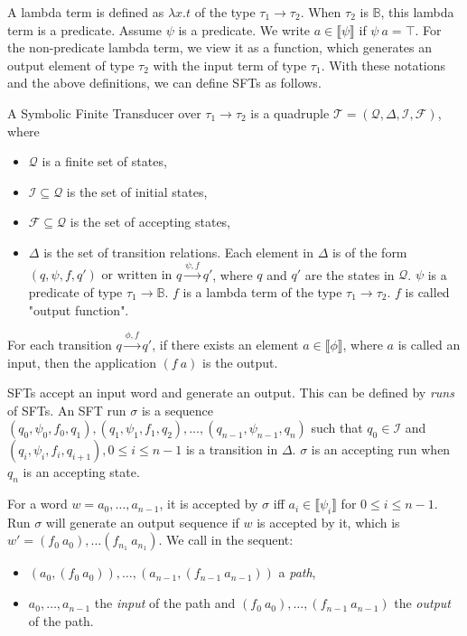 \documentclass[a4paper,UKenglish,cleveref, autoref, thm-restate]{lipics-v2021}
\begin{document}
A lambda term is defined as $\lambda x. t$ of the type $\tau_1 \rightarrow \tau_2$.
When $\tau_2$ is $\mathbb{B}$, this lambda term is a predicate. Assume $\psi$ is a predicate. We write $a\in \llbracket\psi \rrbracket$ if $\psi~a=\top$. For the non-predicate lambda term, we view it as a function, which generates an output element of type $\tau_2$ with the input term of type $\tau_1$. 
With these notations and the above definitions, we can define SFTs as follows.

\begin{definition}
\label{def-sft}
   A Symbolic Finite Transducer over $\tau_1\rightarrow \tau_2$ is a quadruple $\mathcal{T} = (\mathcal{Q}, \Delta, \mathcal{I}, \mathcal{F})$, where 
   \begin{itemize}
   \item $\mathcal{Q}$ is a finite set of states,
   \item $\mathcal{I}\subseteq \mathcal{Q}$ is the set of initial states,
   \item $\mathcal{F} \subseteq\mathcal{Q}$ is the set of accepting states,
   \item $\Delta$ is the set of transition relations. Each element in $\Delta$ is of the form $(q, \psi, f, q') \text{ or}$ $\text{written in }q\xrightarrow{\psi, f} q'$, where $q$ and $q'$ are the states in $\mathcal{Q}$.
   $\psi$ is a predicate of type $\tau_1\rightarrow \mathbb{B}$.
   $f$ is a lambda term of the type $\tau_1\rightarrow \tau_2$. $f$ is called "output function".
   \end{itemize}

For each transition $q\xrightarrow{\phi, f} q'$, if there exists an element $a\in \llbracket \phi \rrbracket$, where $a$ is called an input,  then the application $(f~a)$ is the output.
   
\end{definition}

SFTs accept an input word and generate an output. This can be defined by \emph{runs} of SFTs.
An SFT run $\sigma$ is a sequence $(q_0, \psi_0, f_0, q_1),(q_1, \psi_1, f_1, q_2),\ldots, (q_{n-1}, \psi_{n-1}, q_n)$ such that $q_0\in \mathcal{I}$ and $(q_i, 
\psi_i, f_i, q_{i+1}), 0 \leq i \leq n-1$ is a transition in $\Delta$.
$\sigma$ is an accepting run when $q_n$ is an accepting state.

For a word $w = a_0,\ldots, a_{n-1}$, it is accepted by $\sigma$ iff $a_i \in \llbracket\psi_i \rrbracket$ for $0 \leq i \leq n - 1$. Run $\sigma$ will generate an output sequence if $w$ is accepted by it, which is $w'= (f_0~a_0), \ldots (f_{n_1}~a_{n_1})$. We call in the sequent:
\begin{itemize}
\item  $(a_0,(f_0~a_0)), \ldots, (a_{n-1},(f_{n-1}~a_{n-1}))$ a \emph{path},
\item $a_0,\ldots,a_{n-1}$ the \emph{input} of the path and $(f_0~a_0), \ldots, (f_{n-1}~a_{n-1})$ the \emph{output} of the path.
\end{itemize}
\end{document}
